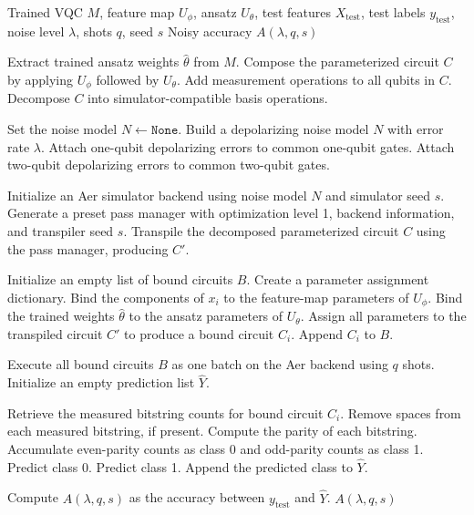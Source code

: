 \documentclass[conference]{IEEEtran}
\begin{document}
\begin{algorithm}[H]
\caption{Fixed-Model Noisy VQC Evaluation}
\label{alg:noisy_eval}
\begin{algorithmic}[1]
\Require Trained VQC $M$, feature map $U_{\phi}$, ansatz $U_{\theta}$, test features $X_{\mathrm{test}}$, test labels $y_{\mathrm{test}}$, noise level $\lambda$, shots $q$, seed $s$
\Ensure Noisy accuracy $A(\lambda,q,s)$

\State Extract trained ansatz weights $\hat{\theta}$ from $M$.
\State Compose the parameterized circuit $C$ by applying $U_{\phi}$ followed by $U_{\theta}$.
\State Add measurement operations to all qubits in $C$.
\State Decompose $C$ into simulator-compatible basis operations.

    \State Set the noise model $N \gets \texttt{None}$.
\Else
    \State Build a depolarizing noise model $N$ with error rate $\lambda$.
    \State Attach one-qubit depolarizing errors to common one-qubit gates.
    \State Attach two-qubit depolarizing errors to common two-qubit gates.
\EndIf

\State Initialize an Aer simulator backend using noise model $N$ and simulator seed $s$.
\State Generate a preset pass manager with optimization level 1, backend information, and transpiler seed $s$.
\State Transpile the decomposed parameterized circuit $C$ using the pass manager, producing $C'$.

\State Initialize an empty list of bound circuits $B$.
    \State Create a parameter assignment dictionary.
    \State Bind the components of $x_i$ to the feature-map parameters of $U_{\phi}$.
    \State Bind the trained weights $\hat{\theta}$ to the ansatz parameters of $U_{\theta}$.
    \State Assign all parameters to the transpiled circuit $C'$ to produce a bound circuit $C_i$.
    \State Append $C_i$ to $B$.
\EndFor

\State Execute all bound circuits $B$ as one batch on the Aer backend using $q$ shots.
\State Initialize an empty prediction list $\hat{Y}$.

    \State Retrieve the measured bitstring counts for bound circuit $C_i$.
    \State Remove spaces from each measured bitstring, if present.
    \State Compute the parity of each bitstring.
    \State Accumulate even-parity counts as class 0 and odd-parity counts as class 1.
        \State Predict class 0.
    \Else
        \State Predict class 1.
    \EndIf
    \State Append the predicted class to $\hat{Y}$.
\EndFor

\State Compute $A(\lambda,q,s)$ as the accuracy between $y_{\mathrm{test}}$ and $\hat{Y}$.
\State \Return $A(\lambda,q,s)$
\end{algorithmic}
\end{algorithm}
\end{document}
